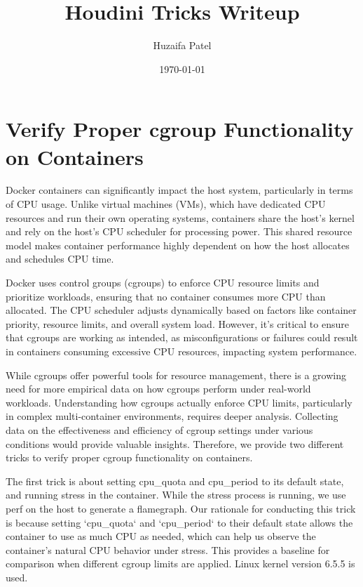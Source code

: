 \documentclass{report}  %
\title{Houdini Tricks Writeup}  %
\author{Huzaifa Patel}  %
\date{\today}  %
\begin{document}

\maketitle %


\section{Verify Proper cgroup Functionality on Containers}

\large{
Docker containers can significantly impact the host system, particularly in terms of CPU usage. Unlike virtual machines (VMs), which have dedicated CPU resources and run their own operating systems, containers share the host's kernel and rely on the host’s CPU scheduler for processing power. This shared resource model makes container performance highly dependent on how the host allocates and schedules CPU time.

Docker uses control groups (cgroups) to enforce CPU resource limits and prioritize workloads, ensuring that no container consumes more CPU than allocated. The CPU scheduler adjusts dynamically based on factors like container priority, resource limits, and overall system load. However, it’s critical to ensure that cgroups are working as intended, as misconfigurations or failures could result in containers consuming excessive CPU resources, impacting system performance.

While cgroups offer powerful tools for resource management, there is a growing need for more empirical data on how cgroups perform under real-world workloads. Understanding how cgroups actually enforce CPU limits, particularly in complex multi-container environments, requires deeper analysis. Collecting data on the effectiveness and efficiency of cgroup settings under various conditions would provide valuable insights. Therefore, we provide two different tricks to verify proper cgroup functionality on containers.

The first trick is about setting cpu\_quota and cpu\_period to its default state, and running stress in the container. While the stress process is running, we use perf on the host to generate a flamegraph. Our rationale for conducting this trick is because setting `cpu\_quota` and `cpu\_period` to their default state allows the container to use as much CPU as needed, which can help us observe the container's natural CPU behavior under stress. This provides a baseline for comparison when different cgroup limits are applied. Linux kernel version 6.5.5 is used.
}
\end{document}
